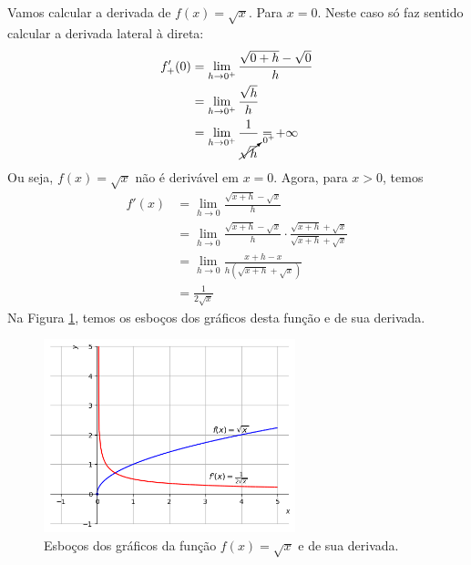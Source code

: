 \cleardoublepage\documentclass[../main.tex]{subfiles}
\begin{document}
\begin{ex}\label{ex:deriv_sqrtx}
  Vamos calcular a derivada de $f(x) = \sqrt{x}$. Para $x=0$. Neste caso só faz sentido calcular a derivada lateral à direta:
  \begin{align*}
    f'_{+}(0) &= \lim_{h\to 0^+} \frac{\sqrt{0+h}-\sqrt{0}}{h} \\
              &= \lim_{h\to 0^+} \frac{\sqrt{h}}{h} \\
              &= \lim_{h\to 0^+} \frac{1}{\cancelto{0^+}{\sqrt{h}}} = +\infty
  \end{align*}
  Ou seja, $f(x) = \sqrt{x}$ não é derivável em $x=0$. Agora, para $x> 0$, temos
  \begin{align}
    f'(x) &= \lim_{h\to 0} \frac{\sqrt{x+h}-\sqrt{x}}{h}\nonumber\\
          &= \lim_{h\to 0} \frac{\sqrt{x+h}-\sqrt{x}}{h}\cdot \frac{\sqrt{x+h}+\sqrt{x}}{\sqrt{x+h}+\sqrt{x}}\nonumber\\
          &= \lim_{h\to 0} \frac{x+h-x}{h(\sqrt{x+h}+\sqrt{x})}\nonumber\\
          &= \frac{1}{2\sqrt{x}}\label{eq:DerivRaizX}
  \end{align}
  Na Figura \ref{fig:deriv_ex_ffl_sqrtx}, temos os esboços dos gráficos desta função e de sua derivada.

  \begin{figure}[H]
    \centering
    \includegraphics[width=0.65\textwidth]{fig_deriv/fig_deriv_ex_ffl_sqrtx}
    \caption{Esboços dos gráficos da função $f(x)=\sqrt{x}$ e de sua derivada.}
    \label{fig:deriv_ex_ffl_sqrtx}
  \end{figure}
\end{ex}
\end{document}
